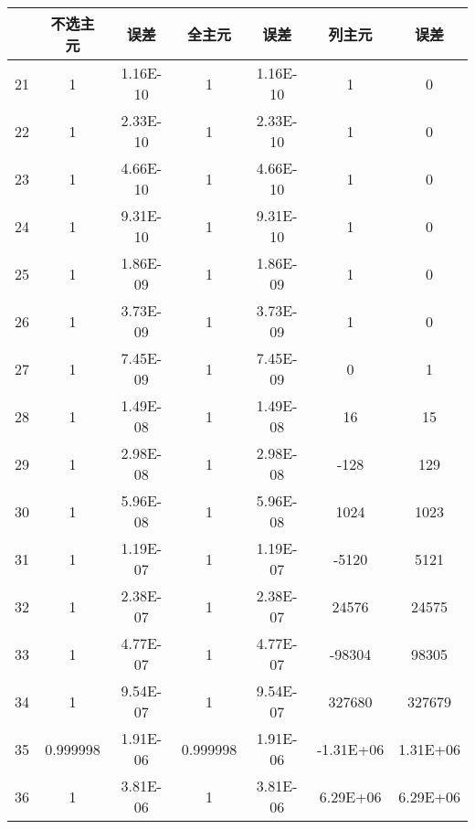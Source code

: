 \documentclass{article}
\begin{document}
\begin{table}[htbp]
	\centering
	\begin{tabular}{lcccccc}
		\toprule
		\textbf{} & \textbf{不选主元} & \textbf{误差} & \textbf{全主元} & \textbf{误差} & \textbf{列主元} & \textbf{误差} \\
		\midrule
	
		21        & 1           & 1.16E-10      & 1           & 1.16E-10      & 1           & 0             \\
		22        & 1           & 2.33E-10      & 1           & 2.33E-10      & 1           & 0             \\
		23        & 1           & 4.66E-10      & 1           & 4.66E-10      & 1           & 0             \\
		24        & 1           & 9.31E-10      & 1           & 9.31E-10      & 1           & 0             \\
		25        & 1           & 1.86E-09      & 1           & 1.86E-09      & 1           & 0             \\
		26        & 1           & 3.73E-09      & 1           & 3.73E-09      & 1           & 0             \\
		27        & 1           & 7.45E-09      & 1           & 7.45E-09      & 0           & 1             \\
		28        & 1           & 1.49E-08      & 1           & 1.49E-08      & 16          & 15            \\
		29        & 1           & 2.98E-08      & 1           & 2.98E-08      & -128        & 129           \\
		30        & 1           & 5.96E-08      & 1           & 5.96E-08      & 1024        & 1023          \\
		31        & 1           & 1.19E-07      & 1           & 1.19E-07      & -5120       & 5121          \\
		32        & 1           & 2.38E-07      & 1           & 2.38E-07      & 24576       & 24575         \\
		33        & 1           & 4.77E-07      & 1           & 4.77E-07      & -98304      & 98305         \\
		34        & 1           & 9.54E-07      & 1           & 9.54E-07      & 327680      & 327679        \\
		35        & 0.999998    & 1.91E-06      & 0.999998    & 1.91E-06      & -1.31E+06   & 1.31E+06      \\
		36        & 1           & 3.81E-06      & 1           & 3.81E-06      & 6.29E+06    & 6.29E+06      \\

\end{tabular}
\end{table}
\end{document}
